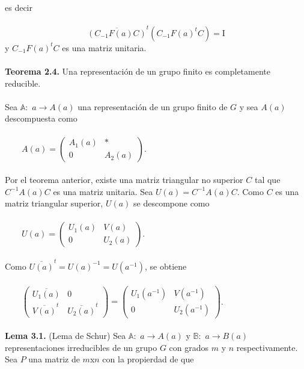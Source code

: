 \documentclass[12pt]{book}
\theoremstyle{definition}
\newcounter{in}
\newcounter{ini}
\begin{document}
es decir\\~\\
\begin{equation*}
\overline{(C_{-1}F(a)C)}^{t}(C_{-1}F(a)^{t}C)=\mathrm{I}
\end{equation*}
y $C_{-1}F(a)^{t}C$ es una matriz unitaria.\\~\\
\textbf{Teorema 2.4.} Una representación de un grupo finito es completamente reducible.\\~\\
Sea $\mathbb{A}:$ $a\rightarrow A\left(a\right)$ una representación de un grupo finito de $G$ y sea $A(a)$ descompuesta como\\~\\
$\qquad
A(a)=
\begin{pmatrix}
A_{1}(a) & * \\ 
0 & A_{2}(a)
\end{pmatrix}$.\\~\\
Por el teorema anterior, existe una matriz triangular no superior $C$ tal que $C^{-1}A(a)C$ es una matriz unitaria. Sea $U(a)=C^{-1}A(a)C$. Como $C$ es una matriz triangular superior, $U(a)$ se descompone como\\~\\
$\qquad
U(a)=
\begin{pmatrix}
U_{1}(a) & V(a) \\ 
0 & U_{2}(a)
\end{pmatrix}$.\\~\\
Como $\overline{U(a)}^{t}=U(a)^{-1}=U(a^{-1})$, se obtiene\\~\\
$\qquad
\begin{pmatrix}
\overline{U_{1}(a)} & 0 \\ 
\overline{V(a)}^{t} & \overline{U_{2}(a)}^{t}
\end{pmatrix}
=
\begin{pmatrix}
U_{1}(a^{-1}) & V(a^{-1}) \\ 
0 & U_{2}(a^{-1})
\end{pmatrix}$.\\~\\
\textbf{Lema 3.1.} (Lema de Schur) Sea $\mathbb{A}:$ $a\rightarrow A\left(a\right)$ y $\mathbb{B}:$ $a\rightarrow B\left(a\right)$ representaciones irreducibles de un grupo $G$ con grados $m$ y $n$ respectivamente. Sea $P$ una matriz de $m$x$n$ con la propierdad de que\\~\\
\end{document}

